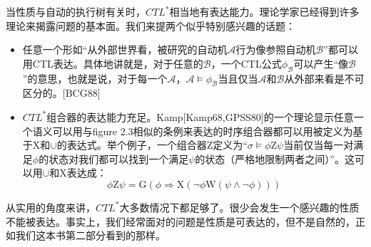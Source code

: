 \documentclass{book}
\begin{document}
    当性质与自动的执行树有关时，$CTL^*$相当地有表达能力。理论学家已经得到许多理论来揭露问题的基本面。我们来提两个似乎特别感兴趣的话题：
    \begin{itemize}
      \item 任意一个形如“从外部世界看，被研究的自动机$\mathcal{A}$行为像参照自动机$\mathcal{B}$”都可以用CTL表达。具体地讲就是，对于任意的$\mathcal{B}$，一个CTL公式$\phi_{\mathcal{B}}$可以产生“像$\mathcal{B}$”的意思，也就是说，对于每一个$\mathcal{A}$，$\mathcal{A} \models \phi_{\mathcal{B}}$当且仅当$\mathcal{A}$和$\mathcal{B}$从外部来看是不可区分的。[BCG88]
      \item $CTL^*$组合器的表达能力充足。Kamp[Kamp68,GPSS80]的一个理论显示任意一个语义可以用与figure 2.3相似的条例来表达的时序组合器都可以用被定义为基于$\mathrm{X}$和$\cup$的表达式。举个例子，一个组合器$\mathrm{Z}$定义为“$\sigma \models \phi \mathrm{Z} \psi$当前仅当每一对满足$\phi$的状态对我们都可以找到一个满足$\psi$的状态（严格地限制两者之间）”。这可以用$\cup$和$\mathrm{X}$表达成：
          \begin{equation*}
            \phi\mathrm{Z}\psi=\mathrm{G}(\phi \Rightarrow \mathrm{X}(\neg\phi\mathrm{W}(\psi\wedge\neg\phi)))
          \end{equation*}
    \end{itemize}

    从实用的角度来讲，$CTL^*$大多数情况下都足够了。很少会发生一个感兴趣的性质不能被表达。事实上，我们经常面对的问题是性质是可表达的，但不是自然的，正如我们这本书第二部分看到的那样。
\end{document}
